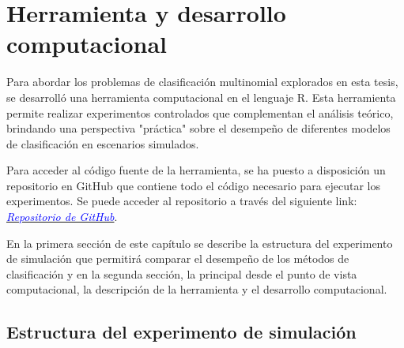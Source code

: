 \documentclass{report}
\begin{document}

 
 
  
  
 
 
 
 




\chapter{ Herramienta y desarrollo computacional }\label{herramienta}




Para abordar los problemas de clasificación multinomial explorados en esta tesis, se desarrolló una herramienta computacional en el lenguaje R. Esta herramienta permite realizar experimentos controlados que complementan el análisis teórico, brindando una perspectiva "práctica" sobre el desempeño de diferentes modelos de clasificación en escenarios simulados.





Para acceder al código fuente de la herramienta, se ha puesto a disposición un repositorio en GitHub que contiene todo el código necesario para ejecutar los experimentos. 
Se puede acceder al repositorio a través del siguiente link: \href{https://github.com/EAMolina500/Classifiers-Comparison}{\textcolor{blue}{\textit{Repositorio de GitHub}}}.

En la primera sección de este capítulo se describe la estructura del experimento de simulación que permitirá comparar el desempeño de los métodos de clasificación y en la segunda sección, la principal desde el punto de vista computacional, la descripción de la herramienta y el desarrollo computacional. 



\section{Estructura del experimento de simulación}
\end{document}

